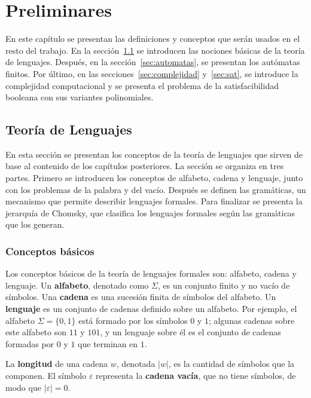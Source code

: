 
\chapter{Preliminares}
\label{cap:preliminares}

En este capítulo se presentan las definiciones y conceptos que serán
usados en el resto del trabajo. En la
sección~\ref{sec:teoria-lenguajes} se introducen las nociones
básicas de la teoría de lenguajes. Después, en la
sección~\ref{sec:automatas}, se presentan los autómatas finitos. Por
último, en las secciones~\ref{sec:complejidad} y~\ref{sec:sat}, se
introduce la complejidad computacional y se presenta el problema de la
satisfacibilidad booleana con sus variantes polinomiales.

\section{Teoría de Lenguajes}
\label{sec:teoria-lenguajes}

En esta sección se presentan los conceptos de la teoría de lenguajes
que sirven de base al contenido de los capítulos posteriores. La sección
se organiza en tres partes. Primero se introducen los conceptos de
alfabeto, cadena y lenguaje, junto con los problemas de la palabra y
del vacío. Después se definen las gramáticas, un mecanismo que permite
describir lenguajes formales. Para finalizar se presenta la jerarquía
de Chomsky, que clasifica los lenguajes formales según las gramáticas que
los generan.

\subsection{Conceptos básicos}

Los conceptos básicos de la teoría de lenguajes formales son: alfabeto,
cadena y lenguaje. Un \textbf{alfabeto}, denotado como $\Sigma$, es un
conjunto finito y no vacío de símbolos. Una \textbf{cadena} es una
sucesión finita de símbolos del alfabeto. Un \textbf{lenguaje} es un
conjunto de cadenas definido sobre un alfabeto. Por ejemplo, el alfabeto
$\Sigma = \{0, 1\}$ está formado por los símbolos $0$ y $1$; algunas
cadenas sobre este alfabeto son $11$ y $101$, y un lenguaje sobre él es el
conjunto de cadenas formadas por $0$ y $1$ que terminan en $1$.

La \textbf{longitud} de una cadena $w$, denotada $|w|$, es la cantidad de
símbolos que la componen. El símbolo $\varepsilon$ representa la
\textbf{cadena vacía}, que no tiene símbolos, de modo que
$|\varepsilon| = 0$.

